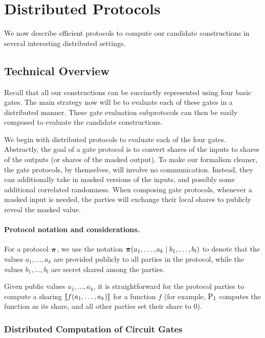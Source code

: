 \newpage
\section{Distributed Protocols}
\label{sec:distributed_protocols}
We now describe efficient protocols to compute our candidate constructions in several interesting distributed settings.


\subsection{Technical Overview}
Recall that all our constructions can be succinctly represented using four basic gates. The main strategy now will be to evaluate each of these gates in a distributed manner. These gate evaluation subprotocols can then be easily composed to evaluate the  candidate constructions. 

We begin with distributed protocols to evaluate each of the four gates. Abstractly, the goal of a gate protocol is to convert shares of the inputs to shares of the outputs (or shares of the masked output). To make our formalism cleaner, the gate protocols, by themselves, will involve no communication. Instead, they can additionally take in masked versions of the inputs, and possibly some additional correlated randomness. When composing gate protocols, whenever a masked input is needed, the parties will exchange their local shares to publicly reveal the masked value.

\paragraph{Protocol notation and considerations.}
For a protocol $\boldsymbol{\pi}$, we use the notation $\boldsymbol{\pi}(a_1, \dots, a_k \mid b_1, \dots, b_l)$ to denote that the values $a_1, \dots, a_k$ are provided publicly to all parties in the protocol, while the values $b_1, \dots, b_l$ are secret shared among the parties.

Given public values $a_1, \dots, a_k$, it is straightforward for the protocol parties to compute a sharing $\left\llbracket f(a_1, \dots, a_k) \right\rrbracket$ for a function $f$ (for example, $\textnormal{P}_1$ computes the function as its share, and all other parties set their share to $0$).

\subsubsection{Distributed Computation of Circuit Gates}

